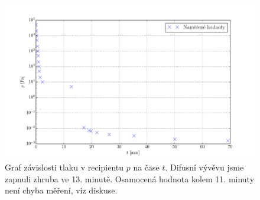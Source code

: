 \documentclass[english]{article}
\begin{document}
\begin{figure}[h!]
	\begin{center}
		\vspace*{-0.5cm}
		\includegraphics[width=\linewidth]{../plt/01_p.pdf}
		\vspace*{-0,7cm}
		\caption{Graf závislosti tlaku v recipientu $p$ na čase $t$. Difusní vývěvu jsme zapnuli zhruba ve 13. minutě. Osamocená hodnota kolem 11. minuty není chyba měření, viz diskuse.}
		\label{fig:g_tlak}
	\end{center}
\end{figure}
\end{document}
